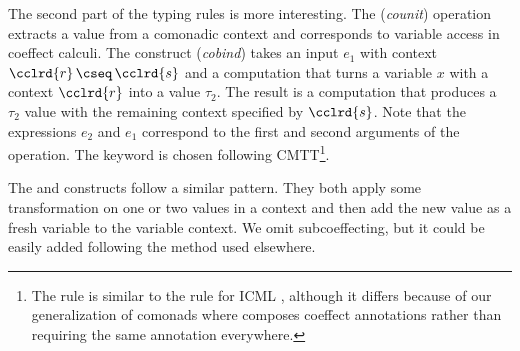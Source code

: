 The second part of the typing rules is more interesting. The (\emph{counit}) operation extracts
a value from a comonadic context and corresponds to variable access in coeffect calculi. The
 construct (\emph{cobind}) takes an input $e_1$ with context $\cclrd{r}\,\cseq\,\cclrd{s}$
and a computation that turns a variable $x$ with a context $\cclrd{r}$ into a value $\tau_2$.
The result is a computation that produces a $\tau_2$ value with the remaining context specified
by $\cclrd{s}$. Note that the expressions $e_2$ and $e_1$ correspond to the first and second
arguments of the  operation. The keyword  is chosen following
CMTT\footnote{The rule is similar to the  rule for ICML \cite[p. 14]{logic-cmtt},
although it differs because of our generalization of comonads where  composes
coeffect annotations rather than requiring the same annotation everywhere.}.

The  and  constructs follow a similar pattern. They both apply some
transformation on one or two values in a context and then add the new value as a fresh variable
to the variable context. We omit subcoeffecting, but it could be easily added following
the method used elsewhere.


